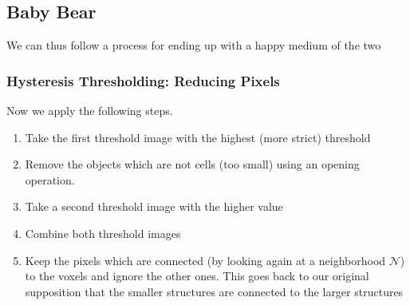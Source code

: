 \documentclass[letterpaper,10pt,english]{sphinxmanual}
\begin{document}
\begin{sphinxVerbatim}[commandchars=\\\{\}]
\PYG{p}{[}\PYG{p}{]}\PYG{p}{[}\PYG{p}{]} 
\PYG{p}{[}\PYG{p}{]}\PYG{p}{[}\PYG{p}{]}
\end{sphinxVerbatim}

\noindent{}


\subsection{Baby Bear}
\label{\detokenize{05-AdvancedSegmentation:baby-bear}}
\sphinxAtStartPar
We can thus follow a process for ending up with a happy medium of the two


\subsubsection{Hysteresis Thresholding: Reducing Pixels}
\label{\detokenize{05-AdvancedSegmentation:hysteresis-thresholding-reducing-pixels}}
\sphinxAtStartPar
Now we apply the following steps.
\begin{enumerate}
%
\item {} 
\sphinxAtStartPar
Take the first threshold image with the highest (more strict) threshold

\item {} 
\sphinxAtStartPar
Remove the objects which are not cells (too small) using an opening operation.

\item {} 
\sphinxAtStartPar
Take a second threshold image with the higher value

\item {} 
\sphinxAtStartPar
Combine both threshold images

\item {} 
\sphinxAtStartPar
Keep the  pixels which are connected (by looking again at a neighborhood \(\mathcal{N}\)) to the  voxels and ignore the other ones. This goes back to our original supposition that the smaller structures are connected to the larger structures

\end{enumerate}
\end{document}
